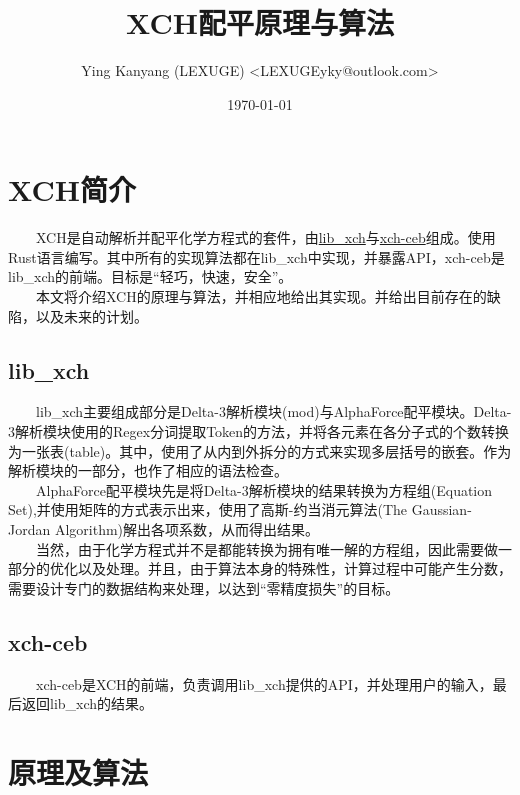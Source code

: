 \documentclass[1pt]{article}
\title{XCH配平原理与算法}
\author{Ying Kanyang (LEXUGE) <LEXUGEyky@outlook.com>}
\date{\today}
\begin{document}
  \maketitle
  \newpage
  \tableofcontents
  \newpage
  \section{XCH简介}
  　　XCH是自动解析并配平化学方程式的套件，由\href{https://crates.io/crates/lib_xch}{lib\_xch}与\href{https://crates.io/crates/xch-ceb}{xch-ceb}组成。使用Rust语言编写。其中所有的实现算法都在lib\_xch中实现，并暴露API，xch-ceb是lib\_xch的前端。目标是“轻巧，快速，安全”。\\
  　　本文将介绍XCH的原理与算法，并相应地给出其实现。并给出目前存在的缺陷，以及未来的计划。
  \subsection{lib\_xch}
  　　lib\_xch主要组成部分是Delta-3解析模块(mod)与AlphaForce配平模块。Delta-3解析模块使用的Regex分词提取Token的方法，并将各元素在各分子式的个数转换为一张表(table)。其中，使用了从内到外拆分的方式来实现多层括号的嵌套。作为解析模块的一部分，也作了相应的语法检查。\\
  　　AlphaForce配平模块先是将Delta-3解析模块的结果转换为方程组(Equation Set),并使用矩阵的方式表示出来，使用了高斯-约当消元算法(The Gaussian-Jordan Algorithm)解出各项系数，从而得出结果。\\
  　　当然，由于化学方程式并不是都能转换为拥有唯一解的方程组，因此需要做一部分的优化以及处理。并且，由于算法本身的特殊性，计算过程中可能产生分数，需要设计专门的数据结构来处理，以达到“零精度损失”的目标。
  \subsection{xch-ceb}
  　　xch-ceb是XCH的前端，负责调用lib\_xch提供的API，并处理用户的输入，最后返回lib\_xch的结果。
  \section{原理及算法}
\end{document}
